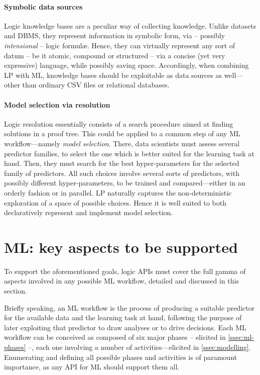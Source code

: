 \documentclass[
]{ceurart}
\begin{document}
\paragraph{Symbolic data sources}
%
Logic knowledge bases are a peculiar way of collecting knowledge.
%
Unlike datasets and DBMS, they represent information in symbolic form, via -- possibly \emph{intensional} -- logic formul\ae{}.
%
Hence, they can virtually represent any sort of datum -- be it atomic, compound or structured -- via a concise (yet very expressive) language, while possibly saving space.
%
Accordingly, when combining LP with ML, knowledge bases should be exploitable as data sources as well---other than ordinary CSV files or relational databases.

\paragraph{Model selection via resolution}
%
Logic resolution essentially consists of a search procedure aimed at finding solutions in a proof tree.
%
This could be applied to a common step of any ML workflow---namely \emph{model selection}.
%
There, data scientists must assess several predictor families, to select the one which is better suited for the learning task at hand.
%
Then, they must search for the best hyper-parameters for the selected family of predictors.
%
All such choices involve several sorts of predictors, with possibly different hyper-parameters, to be trained and compared---either in an orderly fashion or in parallel.
%
LP naturally captures the non-deterministic exploration of a space of possible choices.
%
Hence it is well suited to both declaratively represent and implement model selection.

\section{ML: key aspects to be supported}
\label{sec:requirements}

To support the aforementioned goals, logic APIs must cover the full gamma of aspects involved in any possible ML workflow, detailed and discussed in this section.

Briefly speaking, an ML workflow is the process of producing a suitable predictor for the available data and the learning task at hand, following the purpose of later exploiting that predictor to draw analyses or to drive decisions.
%
%
Each ML workflow can be conceived as composed of six major phases -- elicited in \cref{ssec:ml-phases} --, each one involving a number of activities---elicited in \cref{ssec:modelling}.
%
Enumerating and defining all possible phases and activities is of paramount importance, as any API for ML should support them all.
\end{document}
